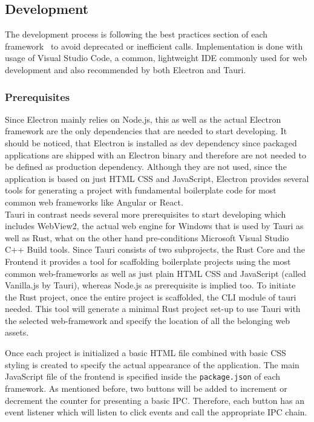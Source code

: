 
\subsection{Development}
\label{subsec:impl:dev}
The development process is following the best practices section of each framework~\cite{ElectronDoc}\cite{tauri} to avoid deprecated or inefficient calls.
Implementation is done with usage of Visual Studio Code, a common, lightweight \ac{IDE} commonly used for web development and also recommended by both Electron and Tauri.

\subsubsection{Prerequisites}

Since Electron mainly relies on Node.js, this as well as the actual Electron framework are the only dependencies that are needed to start developing.
It should be noticed, that Electron is installed as dev dependency since packaged applications are shipped with an Electron binary and therefore are not needed to be defined as production dependency.
Although they are not used, since the application is based on just \ac{HTML} \ac{CSS} and JavaScript, Electron provides several tools for generating a project with fundamental boilerplate code for most common web frameworks like Angular or React.\\
Tauri in contrast needs several more prerequisites to start developing which includes WebView2, the actual web engine for Windows that is used by Tauri as well as Rust, what on the other hand pre-conditions Microsoft Visual Studio C++ Build tools.
Since Tauri consists of two subprojects, the Rust Core and the Frontend it provides a tool for scaffolding boilerplate projects using the most common web-frameworks as well as just plain \ac{HTML} \ac{CSS} and JavaScript (called Vanilla.js by Tauri),
whereas Node.js as prerequisite is implied too.
To initiate the Rust project, once the entire project is scaffolded, the CLI module of tauri needed.
This tool will generate a minimal Rust project set-up to use Tauri with the selected web-framework and specify the location of all the belonging web assets.

Once each project is initialized a basic \ac{HTML} file combined with basic \ac{CSS} styling is created to specify the actual appearance of the application.
The main JavaScript file of the frontend is specified inside the \texttt{package.json} of each framework.
As mentioned before, two buttons will be added to increment or decrement the counter for presenting a basic \ac{IPC}.
Therefore, each button has an event listener which will listen to click events and call the appropriate \ac{IPC} chain.

